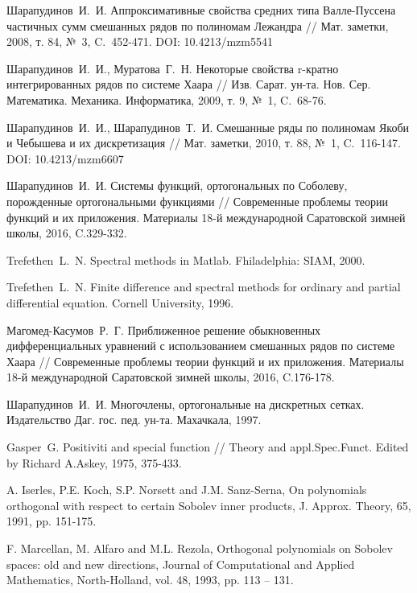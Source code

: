 \begin{thebibliography}{1}
 Шарапудинов~И.~И. Аппроксимативные свойства средних типа Валле-Пуссена частичных сумм смешанных рядов по полиномам Лежандра // Мат. заметки, 2008, т. 84, №~3, C.~452-471. DOI: 10.4213/mzm5541

 Шарапудинов~И.~И., Муратова~Г.~Н. Некоторые свойства r-кратно интегрированных рядов по системе Хаара // Изв. Сарат. ун-та. Нов. Сер. Математика. Механика. Информатика, 2009, т. 9, №~1, C.~68-76.

 Шарапудинов~И.~И., Шарапудинов~Т.~И. Смешанные ряды по полиномам Якоби и Чебышева и их дискретизация // Мат. заметки, 2010, т. 88, №~1, C.~116-147. DOI: 10.4213/mzm6607

 Шарапудинов~И.~И. Системы функций, ортогональных по Соболеву, порожденные ортогональными функциями // Современные проблемы теории функций и их приложения.  Материалы 18-й международной Саратовской зимней школы, 2016, C.329-332.

 Trefethen~L.~N. Spectral methods in Matlab. Fhiladelphia: SIAM, 2000.

 Trefethen~L.~N. Finite difference and spectral methods for ordinary and partial differential equation. Cornell University, 1996.

 Магомед-Касумов~Р.~Г. Приближенное решение обыкновенных дифференциальных уравнений с использованием смешанных рядов по системе Хаара // Современные проблемы теории функций и их приложения.  Материалы 18-й международной Саратовской зимней школы, 2016, C.176-178.

 Шарапудинов~И.~И. Многочлены, ортогональные на дискретных сетках. Издательство Даг. гос. пед. ун-та. Махачкала, 1997.

 Gasper~G. Positiviti and special function // Theory and appl.Spec.Funct. Edited by Richard A.Askey, 1975, 375-433.



A. Iserles, P.E. Koch, S.P. Norsett and J.M. Sanz-Serna,
On polynomials  orthogonal  with respect  to certain Sobolev inner products,
J. Approx. Theory, 65, 1991, pp. 151-175.



F. Marcellan, M. Alfaro and M.L. Rezola,
Orthogonal polynomials on Sobolev spaces: old and new directions,
Journal of Computational and Applied Mathematics, North-Holland, vol. 48, 1993, pp. 113 -- 131.




\end{thebibliography}
